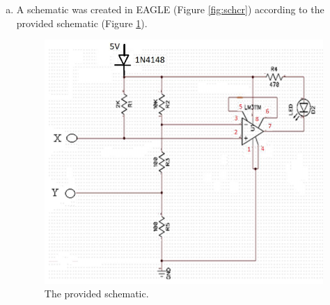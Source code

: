 \documentclass[12pt]{article}
\begin{document}
\begin{enumerate}[a)]
    \item A schematic was created in EAGLE (Figure \ref{fig:schcr}) according to the provided schematic 
        (Figure \ref{fig:schprov}). 

        \begin{figure}[H]
            \centering
            \includegraphics[width=0.5\linewidth]{ctestsch.png}
            \caption{The provided schematic.}
            \label{fig:schprov}
        \end{figure}


\end{enumerate}
\end{document}

